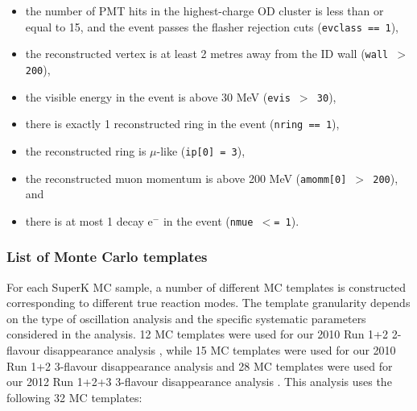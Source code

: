 \begin{itemize}
\item
the number of PMT hits in the highest-charge OD cluster is less than or
equal to 15, and the event passes the flasher rejection cuts
({\tt evclass == 1}),
\item
the reconstructed vertex is at least 2 metres away from the ID wall 
({\tt wall $>$ 200}),
\item
the visible energy in the event is above 30 MeV 
({\tt evis  $>$ 30}),
\item
there is exactly 1 reconstructed ring in the event 
({\tt nring == 1}),
\item
the reconstructed ring is $\mu$-like 
({\tt ip[0] = 3}),
\item
the reconstructed muon momentum is above 200 MeV 
({\tt amomm[0] $>$ 200}), and
\item
there is at most 1 decay e$^{-}$ in the event 
({\tt nmue $<$= 1}).
\end{itemize}

\subsubsection {List of Monte Carlo templates}
\label{sec:mc_templates:template_list}

For each SuperK MC sample, a number of different MC templates is constructed 
corresponding to different true reaction modes.
The template granularity depends on the type of oscillation analysis and the specific 
systematic parameters considered in the analysis.
12 MC templates were used for our 2010 Run 1+2 2-flavour disappearance analysis \cite{OurRun12DisappAnalysis}, while
15 MC templates were used for our 2010 Run 1+2 3-flavour disappearance analysis \cite{OurRun12DisappAnalysis3Flavour} and
28 MC templates were used for our 2012 Run 1+2+3 3-flavour disappearance analysis \cite{OurRun123DisappAnalysis3Flavour}.
This analysis uses the following 32 MC templates:


